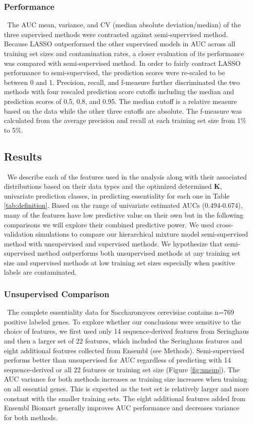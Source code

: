 \documentclass{bmcart}
\begin{document}
\subsubsection*{Performance}\label{subsubsection:performance}\
The AUC mean, variance, and CV (median absolute deviation/median) of the three supervised methods were contrasted against semi-supervised method. Because LASSO outperformed the other supervised models in AUC across all training set sizes and contamination rates, a closer evaluation of its performance was compared with semi-supervised method. In order to fairly contract LASSO performance to semi-supervised, the prediction scores were re-scaled to be between 0 and 1. Precision, recall, and f-measure further discriminated the two methods with four rescaled prediction score cutoffs including the median and prediction scores of 0.5, 0.8, and 0.95. The median cutoff is a relative measure based on the data while the other three cutoffs are absolute. The f-measure was calculated from the average precision and recall at each training set size from 1\% to 5\%.

\subsection*{Results}\label{subsection:results}\
We describe each of the features used in the analysis along with their associated distributions based on their data types and the optimized determined \textbf{K}, univariate prediction classes, in predicting essentiality for each one in Table \ref{tab:definition}. Based on the range of univariate estimated AUCs (0.494-0.674), many of the features have low predictive value on their own but in the following comparisons we will explore their combined predictive power. We used cross-validation simulations to compare our hierarchical mixture model semi-supervised method with unsupervised and supervised methods. We hypothesize that semi-supervised method outperforms both unsupervised methods at any training set size and supervised methods at low training set sizes especially when positive labels are contaminated.

\subsubsection*{Unsupervised Comparison}\label{subsubsection:unsupervised.compare}\
The complete essentiality data for Saccharomyces cerevisiae contains n=769 positive labeled genes. To explore whether our conclusions were sensitive to the choice of features, we first used only 14 sequence-derived features from  Seringhaus and then a larger set of 22 features, which included the Seringhaus features and eight additional features collected from Ensembl (see Methods). Semi-supervised performs better than unsupervised for AUC regardless of predicting with 14 sequence-derived or all 22 features or training set size (Figure \ref{fig:unsup}). The AUC variance for both methods increases as training size increases when training on all essential genes. This is expected as the test set is relatively larger and more constant with the smaller training sets. The eight additional features added from Ensembl Biomart generally improves AUC performance and decreases variance for both methods.
\end{document}
